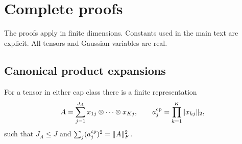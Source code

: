 \section{Complete proofs}\label{app:proofs}

The proofs apply in finite dimensions. Constants used in the main text are explicit. All tensors and Gaussian variables are real.

\subsection{Canonical product expansions}

\begin{lemma}\label{lem:cp}
For a tensor in either cap class there is a finite representation
\[
 A=\sum_{j=1}^{J_A}x_{1j}\otimes\cdots\otimes x_{Kj},\qquad
 a_j^{\mathrm{cp}}=\prod_{k=1}^K\lVert x_{kj}\rVert_2,
\]
such that $J_A\le J$ and $\sum_j(a_j^{\mathrm{cp}})^2=\lVert A\rVert_F^2$.
\end{lemma}

